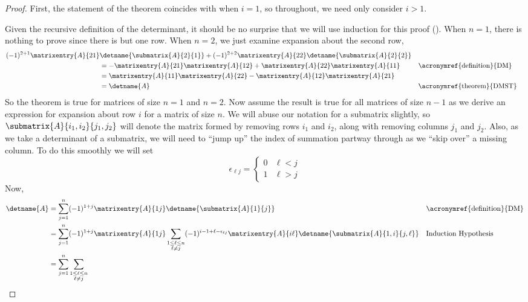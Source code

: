 \begin{proof}
First, the statement of the theorem coincides with  when $i=1$, so throughout, we need only consider $i>1$.\par
%
Given the recursive definition of the determinant, it should be no surprise that we will use induction for this proof ().  When $n=1$, there is nothing to prove since there is but one row.  When $n=2$, we just examine expansion about the second row,
%
\begin{align*}
(-1)^{2+1}\matrixentry{A}{21}&\detname{\submatrix{A}{2}{1}}+
(-1)^{2+2}\matrixentry{A}{22}\detname{\submatrix{A}{2}{2}}\\
&=-\matrixentry{A}{21}\matrixentry{A}{12}+\matrixentry{A}{22}\matrixentry{A}{11}
&&\text{\acronymref{definition}{DM}}\\
%
&=\matrixentry{A}{11}\matrixentry{A}{22}-\matrixentry{A}{12}\matrixentry{A}{21}\\
%
&=
\detname{A}&&\text{\acronymref{theorem}{DMST}}\\
\end{align*}
%
So the theorem is true for matrices of size $n=1$ and $n=2$.  Now assume the result is true for all matrices of size $n-1$ as we derive an expression for expansion about row $i$ for a matrix of size $n$.  We will abuse our notation for a submatrix slightly, so $\submatrix{A}{i_1,i_2}{j_1,j_2}$ will denote the matrix formed by removing rows $i_1$ and $i_2$, along with removing columns $j_1$ and $j_2$.  Also, as we take a determinant of a submatrix, we will need to ``jump up'' the index of summation partway through as we ``skip over'' a missing column.  To do this smoothly we will set 
%
\begin{equation*}
\epsilon_{\ell j}=
\begin{cases}
0 & \ell<j\\
1 & \ell>j
\end{cases}
\end{equation*}
%
Now,
%
\begin{align*}
\detname{A}
&=
\sum_{j=1}^{n}(-1)^{1+j}\matrixentry{A}{1j}\detname{\submatrix{A}{1}{j}}
&&\text{\acronymref{definition}{DM}}\\
%
&=
\sum_{j=1}^{n}(-1)^{1+j}\matrixentry{A}{1j}
\sum_{\substack{1\leq\ell\leq n\\\ell\neq j}}
(-1)^{i-1+\ell-\epsilon_{\ell j}}\matrixentry{A}{i\ell}\detname{\submatrix{A}{1,i}{j,\ell}}
&&\text{Induction Hypothesis}\\
%
&=
\sum_{j=1}^{n}\sum_{\substack{1\leq\ell\leq n\\\ell\neq j}}

\end{align*}
\end{proof}
